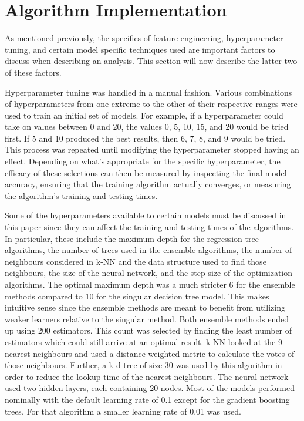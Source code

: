 \section{Algorithm Implementation}
As mentioned previously, the specifics of feature engineering, hyperparameter tuning, and certain model specific techniques used are important factors to discuss when describing an analysis. This section will now describe the latter two of these factors.

Hyperparameter tuning was handled in a manual fashion. Various combinations of hyperparameters from one extreme to the other of their respective ranges were used to train an initial set of models. For example, if a hyperparameter could take on values between 0 and 20, the values 0, 5, 10, 15, and 20 would be tried first. If 5 and 10 produced the best results, then 6, 7, 8, and 9 would be tried. This process was repeated until modifying the hyperparameter stopped having an effect. Depending on what's appropriate for the specific hyperparameter, the efficacy of these selections can then be measured by inspecting the final model accuracy, ensuring that the training algorithm actually converges, or measuring the algorithm's training and testing times.

Some of the hyperparameters available to certain models must be discussed in this paper since they can affect the training and testing times of the algorithms. In particular, these include the maximum depth for the regression tree algorithms, the number of trees used in the ensemble algorithms, the number of neighbours considered in k-NN and the data structure used to find those neighbours, the size of the neural network, and the step size of the optimization algorithms. The optimal maximum depth was a much stricter 6 for the ensemble methods compared to 10 for the singular decision tree model. This makes intuitive sense since the ensemble methods are meant to benefit from utilizing weaker learners relative to the singular method. Both ensemble methods ended up using 200 estimators. This count was selected by finding the least number of estimators which could still arrive at an optimal result. k-NN looked at the 9 nearest neighbours and used a distance-weighted metric to calculate the votes of those neighbours. Further, a k-d tree of size 30 was used by this algorithm in order to reduce the lookup time of the nearest neighbours. The neural network used two hidden layers, each containing 20 nodes. Most of the models performed nominally with the default learning rate of 0.1 except for the gradient boosting trees. For that algorithm a smaller learning rate of 0.01 was used.




